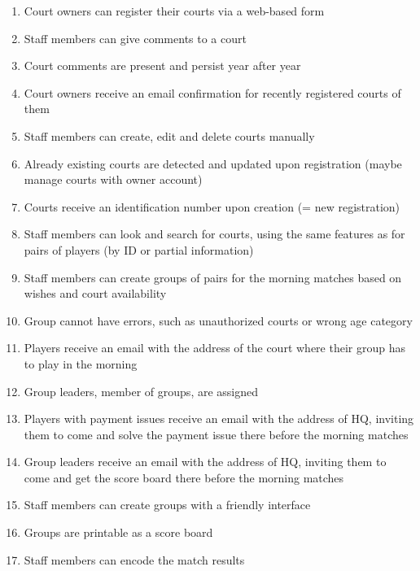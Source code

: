 \begin{enumerate}
    \item Court owners can register their courts via a web-based form
    \item Staff members can give comments to a court
    \item Court comments are present and persist year after year
    \item Court owners receive an email confirmation for recently
        registered courts of them
    \item Staff members can create, edit and delete courts manually
\color{red!80!black}
    \item Already existing courts are detected and updated upon
        registration (maybe manage courts with owner account)
\color{green!60!black}
    \item Courts receive an identification number upon creation (= new
        registration)
\color{red!80!black}
    \item Staff members can look and search for courts, using the same
        features as for pairs of players (by ID or partial information)
    \item Staff members can create groups of pairs for the morning
        matches based on wishes and court availability
    \item Group cannot have errors, such as unauthorized courts or wrong
        age category
    \item Players receive an email with the address of the court where
        their group has to play in the morning
    \item Group leaders, member of groups, are assigned
    \item Players with payment issues receive an email with the address
        of HQ, inviting them to come and solve the payment issue there
        before the morning matches
    \item Group leaders receive an email with the address of HQ,
        inviting them to come and get the score board there before the
        morning matches
    \item Staff members can create groups with a friendly interface
    \item Groups are printable as a score board
    \item Staff members can encode the match results
\end{enumerate}
